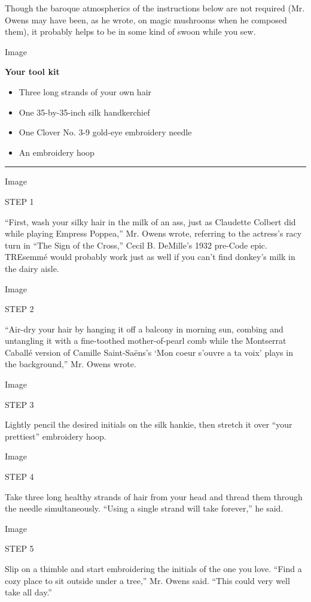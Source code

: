 Though the baroque atmospherics of the instructions below are not
required (Mr. Owens may have been, as he wrote, on magic mushrooms when
he composed them), it probably helps to be in some kind of swoon while
you sew.

Image

\textbf{Your tool kit}

\begin{itemize}
\item
  Three long strands of your own hair
\item
  One 35-by-35-inch silk handkerchief
\item
  One Clover No. 3-9 gold-eye embroidery needle
\item
  An embroidery hoop
\end{itemize}

\begin{center}\rule{0.5\linewidth}{\linethickness}\end{center}

Image

STEP 1

``First, wash your silky hair in the milk of an ass, just as Claudette
Colbert did while playing Empress Poppea,'' Mr. Owens wrote, referring
to the actress's racy turn in ``The Sign of the Cross,'' Cecil B.
DeMille's 1932 pre-Code epic. TREsemmé would probably work just as well
if you can't find donkey's milk in the dairy aisle.

Image

STEP 2

``Air-dry your hair by hanging it off a balcony in morning sun, combing
and untangling it with a fine-toothed mother-of-pearl comb while the
Montserrat Caballé version of Camille Saint-Saëns's `Mon coeur s'ouvre a
ta voix' plays in the background,'' Mr. Owens wrote.

Image

STEP 3

Lightly pencil the desired initials on the silk hankie, then stretch it
over ``your prettiest'' embroidery hoop.

Image

STEP 4

Take three long healthy strands of hair from your head and thread them
through the needle simultaneously. ``Using a single strand will take
forever,'' he said.

Image

STEP 5

Slip on a thimble and start embroidering the initials of the one you
love. ``Find a cozy place to sit outside under a tree,'' Mr. Owens said.
``This could very well take all day.''

